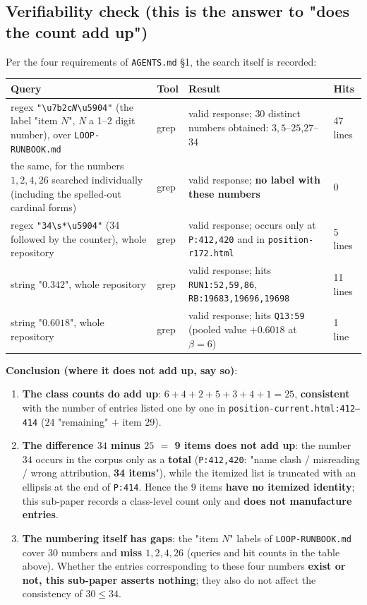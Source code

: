 \documentclass[11pt,a4paper]{article}
\newcommand{\bet}{\beta}
\begin{document}
\subsection{Verifiability check (this is the answer to "does the count add up")}\label{sec:countcheck}

Per the four requirements of \texttt{AGENTS.md} \S1, the search itself is recorded:

\begin{center}
\small
\begin{tabularx}{\textwidth}{@{}L{3.5cm} L{1.4cm} Y L{1.1cm}@{}}
\toprule
\textbf{Query} & \textbf{Tool} & \textbf{Result} & \textbf{Hits} \\
\midrule
regex \texttt{"\textbackslash u7b2c\emph{N}\textbackslash u5904"} (the label "item $N$", \emph{N} a 1--2 digit number), over \texttt{LOOP-RUNBOOK.md} & grep & valid response; $30$ distinct numbers obtained: $3,5$--$25$,$27$--$34$ & 47 lines \\
the same, for the numbers $1,2,4,26$ searched individually (including the spelled-out cardinal forms) & grep & valid response; \textbf{no label with these numbers} & 0 \\
regex \texttt{"34\textbackslash s*\textbackslash u5904"} (34 followed by the counter), whole repository & grep & valid response; occurs only at \texttt{P:412,420} and in \texttt{position-r172.html} & 5 lines \\
string "$0.342$", whole repository & grep & valid response; hits \texttt{RUN1:52,59,86}, \texttt{RB:19683,19696,19698} & 11 lines \\
string "$0.6018$", whole repository & grep & valid response; hits \texttt{Q13:59} (pooled value $+0.6018$ at $\bet=6$) & 1 line \\
\bottomrule
\end{tabularx}
\end{center}

\noindent\textbf{Conclusion (where it does not add up, say so)}:
\begin{enumerate}[leftmargin=1.6em,itemsep=2pt,topsep=2pt]
  \item \textbf{The class counts do add up}: $6+4+2+5+3+4+1=25$, \textbf{consistent} with the number of entries listed one by one in \texttt{position-current.html:412--414} ($24$ "remaining" $+$ item 29).
  \item \textbf{The difference $34$ minus $25$ $=$ 9 items does not add up}: the number $34$ occurs in the corpus only as a \textbf{total} (\texttt{P:412,420}: "name clash / misreading / wrong attribution, \textbf{34 items}"), while the itemized list is truncated with an ellipsis at the end of \texttt{P:414}. Hence the $9$ items \textbf{have no itemized identity}; this sub-paper records a class-level count only and \textbf{does not manufacture entries}.
  \item \textbf{The numbering itself has gaps}: the "item $N$" labels of \texttt{LOOP-RUNBOOK.md} cover $30$ numbers and \textbf{miss $1,2,4,26$} (queries and hit counts in the table above). Whether the entries corresponding to these four numbers \textbf{exist or not, this sub-paper asserts nothing}; they also do not affect the consistency of $30\le 34$.
\end{enumerate}
\end{document}
